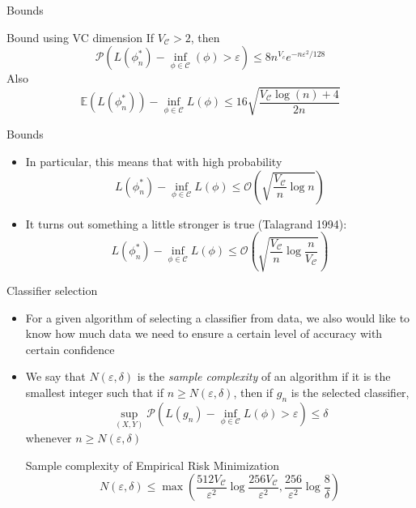 \documentclass{beamer}
\renewcommand{\Pr}[1]{\mathcal{P} \left( #1 \right)}
\newcommand{\cls}{\mathcal{C}}
\newcommand{\E}[1]{\mathbb{E}\left( #1 \right)}
\newcommand{\pa}[1]{\left( #1 \right)}
\newcommand{\eps}{\varepsilon}
\begin{document}
\begin{frame}{Bounds}
\begin{block}{Bound using VC dimension}
If $V_\cls > 2$, then
\[ \Pr{ L(\phi^*_n) - \inf_{\phi \in \cls} (\phi) > \eps } \leq 8 n^{V_c}e^{-n \eps^2/128} \]
Also
\[ \E{L(\phi^*_n)} - \inf_{\phi\in\cls} L(\phi) \leq 16 \sqrt{\frac{V_\cls \log(n) + 4}{2n}} \]
\end{block}
\end{frame}

\begin{frame}{Bounds}
\begin{itemize}
\item In particular, this means that with high probability
\[ L(\phi^*_n) - \inf_{\phi\in\cls} L(\phi) \leq \mathcal{O}\pa{\sqrt{\frac{V_\cls}{n} \log n }} \]
\item It turns out something a little stronger is true (Talagrand 1994):
\[ L(\phi^*_n) - \inf_{\phi\in\cls} L(\phi) \leq \mathcal{O}\pa{\sqrt{\frac{V_\cls}{n} \log\frac{n}{V_\cls}}} \]
\end{itemize}
\end{frame}


\begin{frame}{Classifier selection}
\begin{itemize}
\item For a given algorithm of selecting a classifier from data, we also would like to know how much data we need to ensure a certain level of accuracy with certain confidence
\item We say that $N(\eps,\delta)$ is the \emph{sample complexity} of an algorithm if it is the smallest integer such that if $n \geq N(\eps,\delta)$, then if $g_n$ is the selected classifier,
\[ \sup_{(X,Y)} \Pr{ L(g_n) - \inf_{\phi \in \cls} L(\phi) > \eps} \leq \delta \]
whenever $n \geq N(\eps,\delta)$
\begin{block}{Sample complexity of Empirical Risk Minimization}
\[ N(\eps, \delta) \leq \max\pa{ \frac{512 V_\cls}{\eps^2} \log\frac{256V_\cls}{\eps^2}, \frac{256}{\eps^2}\log\frac8\delta}\]
\end{block}
\end{itemize}
\end{frame}
\end{document}
